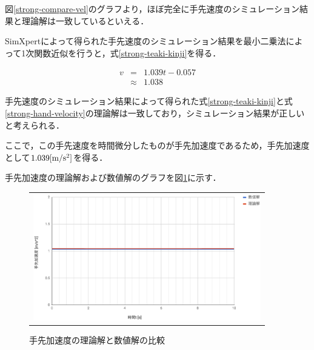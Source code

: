 図\ref{strong-compare-vel}のグラフより，ほぼ完全に手先速度のシミュレーション結果と理論解は一致しているといえる．

SimXpertによって得られた手先速度のシミュレーション結果を最小二乗法によって1次関数近似を行うと，式\ref{strong-teaki-kinji}を得る．

\begin{eqnarray}
 v &=& 1.039t - 0.057 \nonumber \\
 &\approx& 1.038
  \label{strong-teaki-kinji}
\end{eqnarray}

手先速度のシミュレーション結果によって得られた式\ref{strong-teaki-kinji}と式\ref{strong-hand-velocity}の理論解は一致しており，シミュレーション結果が正しいと考えられる．

ここで，この手先速度を時間微分したものが手先加速度であるため，手先加速度として\(1.039[\rm m/s^2]\)を得る．

手先加速度の理論解および数値解のグラフを図\ref{strong-acc}に示す．

\begin{figure}[htbp]
  \begin{center}
    \begin{tabular}{c}
      \includegraphics[height=5.5cm]{img/eps/strong-acc.eps}
    \end{tabular}
    \caption{手先加速度の理論解と数値解の比較}
    \label{strong-acc}
  \end{center}
\end{figure}

